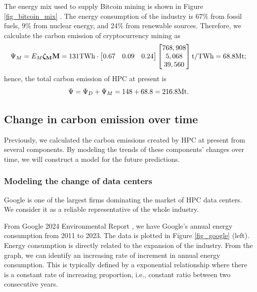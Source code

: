 \documentclass[12pt]{article}
\begin{document}
The energy mix used to supply Bitcoin mining is shown in Figure \ref{fig_bitcoin_mix} \citep{bitcoin_mix}. The energy consumption of the industry is 67\% from fossil fuels, 9\% from nuclear energy, and 24\% from renewable sources. Therefore, we calculate the carbon emission of cryptocurrency mining as
\begin{equation}
	\Psi_M = E_M \boldsymbol{\rm \zeta_M} \vb{M}
	= 131 {\rm TWh} \cdot \begin{bmatrix}
		0.67 & 0.09 & 0.24
	\end{bmatrix}\begin{bmatrix}
		768,908 \\ 5,068 \\ 39,560
	\end{bmatrix} {\rm t/TWh}
	= 68.8 {\rm Mt};
\end{equation}
hence, the total carbon emission of HPC at present is
\begin{equation}
	\Psi = \Psi_D + \Psi_M = 148 + 68.8 = 216.8 {\rm Mt}.
\end{equation}

\subsection{Change in carbon emission over time}

Previously, we calculated the carbon emissions created by HPC at present from several components. By modeling the trends of these components' changes over time, we will construct a model for the future predictions.

\subsubsection{Modeling the change of data centers}

Google is one of the largest firms dominating the market of HPC data centers. We consider it as a reliable representative of the whole industry.

From Google 2024 Environmental Report \citep{google_report}, we have Google's annual energy consumption from 2011 to 2023. The data is plotted in Figure \ref{fig_google} (left). Energy consumption is directly related to the expansion of the industry. From the graph, we can identify an increasing rate of increment in annual energy consumption. This is typically defined by a exponential relationship where there is a constant rate of increasing proportion, i.e., constant ratio between two consecutive years.
\end{document}
